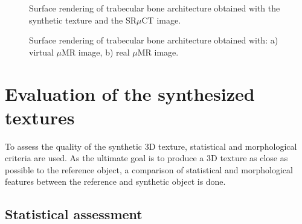 \begin{figure}[h!] 
 \centering
 \caption[Surface rendering of $SR \mu{CT}$ trabecular bone.]{Surface rendering of trabecular bone architecture obtained with the synthetic texture and the SR$\mu$CT image.}
 \label{fig:bone_surface_renderingMuCT} 
\end{figure}

\begin{figure}[h!] 
 \centering 
{}
 \caption[Surface rendering of $\mu$MR trabecular bone.]{Surface rendering of trabecular bone architecture obtained with: a) virtual $\mu$MR image, b) real $\mu$MR image.}
 \label{fig:bone_surface_renderingIRM} 
\end{figure}

\section{Evaluation of the synthesized textures}
\label{sec:EvaluationTexture}

To assess the quality of the synthetic 3D texture, 
statistical and morphological criteria are used.
As the ultimate goal is to produce a 3D texture as close as possible to the reference object, 
a comparison of statistical and morphological features between the reference and synthetic object 
is done.

\subsection{Statistical assessment}
\label{sec:StatisticsTexture}

